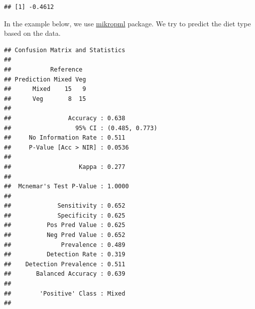 \documentclass[
]{book}
\newenvironment{Shaded}{\begin{snugshade}}{\end{snugshade}}
\newcommand{\AttributeTok}[1]{\textcolor[rgb]{0.77,0.63,0.00}{#1}}
\newcommand{\CommentTok}[1]{\textcolor[rgb]{0.56,0.35,0.01}{\textit{#1}}}
\newcommand{\ControlFlowTok}[1]{\textcolor[rgb]{0.13,0.29,0.53}{\textbf{#1}}}
\newcommand{\DecValTok}[1]{\textcolor[rgb]{0.00,0.00,0.81}{#1}}
\newcommand{\FloatTok}[1]{\textcolor[rgb]{0.00,0.00,0.81}{#1}}
\newcommand{\FunctionTok}[1]{\textcolor[rgb]{0.00,0.00,0.00}{#1}}
\newcommand{\NormalTok}[1]{#1}
\newcommand{\OtherTok}[1]{\textcolor[rgb]{0.56,0.35,0.01}{#1}}
\newcommand{\SpecialCharTok}[1]{\textcolor[rgb]{0.00,0.00,0.00}{#1}}
\newcommand{\StringTok}[1]{\textcolor[rgb]{0.31,0.60,0.02}{#1}}
\begin{document}
\begin{verbatim}
## [1] -0.4612
\end{verbatim}

In the example below, we use \href{https://journals.asm.org/doi/10.1128/mBio.00434-20}{mikropml}
package. We try to predict the diet type based on the data.

\begin{Shaded}
\end{Shaded}

\begin{verbatim}
## Confusion Matrix and Statistics
## 
##           Reference
## Prediction Mixed Veg
##      Mixed    15   9
##      Veg       8  15
##                                         
##                Accuracy : 0.638         
##                  95% CI : (0.485, 0.773)
##     No Information Rate : 0.511         
##     P-Value [Acc > NIR] : 0.0536        
##                                         
##                   Kappa : 0.277         
##                                         
##  Mcnemar's Test P-Value : 1.0000        
##                                         
##             Sensitivity : 0.652         
##             Specificity : 0.625         
##          Pos Pred Value : 0.625         
##          Neg Pred Value : 0.652         
##              Prevalence : 0.489         
##          Detection Rate : 0.319         
##    Detection Prevalence : 0.511         
##       Balanced Accuracy : 0.639         
##                                         
##        'Positive' Class : Mixed         
## 
\end{verbatim}
\end{document}
